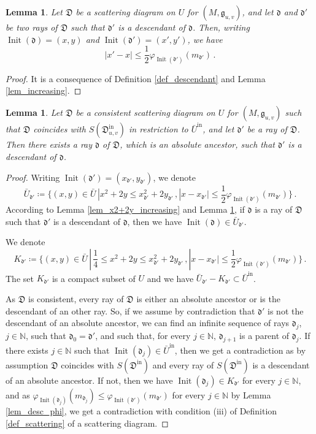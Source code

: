 \documentclass[12pt, a4paper]{amsart}
\newtheorem{lem}[defn]{Lemma}
\newcommand\NN{\mathbb N}
\newcommand\fd{\mathfrak d}
\newcommand\fD{\mathfrak D}
\newcommand\fg{\mathfrak g}
\newcommand\Init{\operatorname{Init}}
\newcommand\iin{\mathrm{in}}
\begin{document}
\begin{lem} \label{lem_x_bound}
Let $\fD$ be a scattering diagram 
on $U$ for 
$(M, \fg_{u,v})$, and 
let $\fd$ and $\fd'$ be two rays of $\fD$
such that $\fd'$ is a descendant of $\fd$. 
Then, writing $\Init(\fd)=(x,y)$ and 
$\Init(\fd')=(x',y')$,
we have 
\[|x'-x|\leqslant \frac{1}{2}\varphi_{\Init(\fd')}(m_{\fd'})\,.\] 
\end{lem}

\begin{proof}
It is a consequence of Definition 
\ref{def_descendant} and Lemma \ref{lem_increasing}.
\end{proof}


\begin{lem} \label{lem_all_descendant}
Let $\fD$ be a consistent scattering diagram on 
$U$ for 
$(M,\fg_{u,v})$ such that 
$\fD$ coincides with $S(\fD^\iin_{u,v})$ in restriction to 
$\bar{U}^\iin$, and let 
$\fd'$ be a ray of $\fD$. Then there exists 
a ray $\fd$ of $\fD$, which is an absolute ancestor, such that 
$\fd'$ is a descendant of $\fd$. 
\end{lem}

\begin{proof}
Writing $\Init(\fd')=(x_{\fd'},y_{\fd'})$,
we denote 
\[ \bar{U}_{\fd'} \coloneq \{ (x,y) \in \bar{U}\,|
x^2+2y \leqslant x_{\fd'}^2+2y_{\fd'}\,,
|x-x_{\fd'}| \leqslant \frac{1}{2} 
\varphi_{\Init(\fd')}(m_{\fd'})\}\,.\]
According to Lemma \ref{lem_x2+2y_increasing} and 
Lemma \ref{lem_x_bound}, if $\fd$ is a ray of
$\fD$ such that $\fd'$ is a descendant of 
$\fd$, then we have 
$\Init(\fd) \in \bar{U}_{\fd'}$.

We denote 
\[ K_{\fd'} \coloneq \{ (x,y) \in \bar{U}\,|\,
\frac{1}{4} \leqslant x^2+2y \leqslant x_{\fd'}^2+2y_{\fd'}\,,
|x-x_{\fd'}| \leqslant \frac{1}{2} 
\varphi_{\Init(\fd')}(m_{\fd'})\}\,.\]
The set $K_{\fd'}$ is a compact subset of $U$ and we have $\bar{U}_{\fd'}-K_{\fd'} \subset \bar{U}^\iin$.

As $\fD$ is consistent, every ray of 
$\fD$ is either an absolute ancestor or 
is the descendant of an other ray.
So, if we assume by contradiction that 
$\fd'$ is not the descendant of an absolute ancestor, we can find an infinite sequence of rays 
$\fd_j$, $j \in \NN$, such that 
$\fd_0=\fd'$, and such that, for every $j \in \NN$, $\fd_{j+1}$ is a parent
of $\fd_j$. If there exists $j \in \NN$ such that $\Init(\fd_j) \in \bar{U}^\iin$, 
then we get a contradiction as by assumption $\fD$ coincides with $S(\fD^\iin)$ and every ray of 
$S(\fD^\iin)$ is a descendant of an absolute ancestor. If not, then we have 
$\Init(\fd_j) \in K_{\fd'}$ for every 
$j \in \NN$, and as $\varphi_{\Init(\fd_j)}(m_{\fd_j}) \leqslant \varphi_{\Init(\fd')}(m_{\fd'})$
for every $j \in \NN$ by Lemma \ref{lem_desc_phi}, we get a contradiction with condition (iii) of Definition \ref{def_scattering} of a scattering diagram.
\end{proof}
\end{document}
